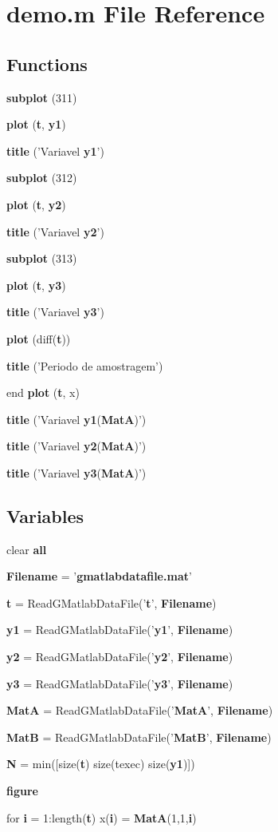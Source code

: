 \section{demo.m File Reference}
\label{libs_2gdatalogger_2demo-pthread_2matlabdatafiles_2demo_8m}
\subsection*{Functions}
\begin{DoxyCompactItemize}
\item 
{\bf subplot} (311)
\item 
{\bf plot} ({\bf t}, {\bf y1})
\item 
{\bf title} ('Variavel {\bf y1}')
\item 
{\bf subplot} (312)
\item 
{\bf plot} ({\bf t}, {\bf y2})
\item 
{\bf title} ('Variavel {\bf y2}')
\item 
{\bf subplot} (313)
\item 
{\bf plot} ({\bf t}, {\bf y3})
\item 
{\bf title} ('Variavel {\bf y3}')
\item 
{\bf plot} (diff({\bf t}))
\item 
{\bf title} ('Periodo de amostragem')
\item 
end {\bf plot} ({\bf t}, x)
\item 
{\bf title} ('Variavel {\bf y1}({\bf MatA})')
\item 
{\bf title} ('Variavel {\bf y2}({\bf MatA})')
\item 
{\bf title} ('Variavel {\bf y3}({\bf MatA})')
\end{DoxyCompactItemize}
\subsection*{Variables}
\begin{DoxyCompactItemize}
\item 
clear {\bf all}
\item 
{\bf Filename} = '{\bf gmatlabdatafile.mat}'
\item 
{\bf t} = ReadGMatlabDataFile('{\bf t}', {\bf Filename})
\item 
{\bf y1} = ReadGMatlabDataFile('{\bf y1}', {\bf Filename})
\item 
{\bf y2} = ReadGMatlabDataFile('{\bf y2}', {\bf Filename})
\item 
{\bf y3} = ReadGMatlabDataFile('{\bf y3}', {\bf Filename})
\item 
{\bf MatA} = ReadGMatlabDataFile('{\bf MatA}', {\bf Filename})
\item 
{\bf MatB} = ReadGMatlabDataFile('{\bf MatB}', {\bf Filename})
\item 
{\bf N} = min([size({\bf t}) size(texec) size({\bf y1})])
\item 
{\bf figure}
\item 
for {\bf i} = 1:length({\bf t}) x({\bf i}) = {\bf MatA}(1,1,{\bf i})
\end{DoxyCompactItemize}


